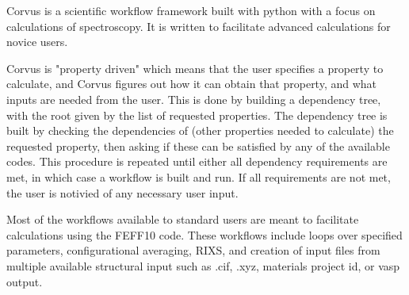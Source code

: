 Corvus is a scientific workflow framework built with python with 
a focus on calculations of spectroscopy. It is written to facilitate
advanced calculations for novice users. 

Corvus is "property driven" which means that the user
specifies a property to calculate, and Corvus figures out 
how it can obtain that property, and what inputs are needed
from the user. This is done by building a dependency tree, with the root
given by the list of requested properties. The dependency tree is built
by checking the dependencies of (other properties needed to calculate) the 
requested property, then asking if these can be satisfied by any
of the available codes. This procedure is repeated until either all dependency
requirements are met, in which case a workflow is built and run. If all requirements
are not met, the user is notivied of any necessary user input.

Most of the workflows available to standard users are meant to facilitate calculations
using the FEFF10 code. These workflows include loops over specified parameters, configurational
averaging, RIXS, and creation of input files from multiple available structural input such as
.cif, .xyz, materials project id, or vasp output. 

